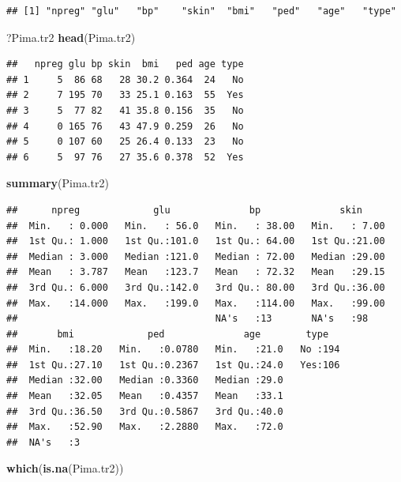 \documentclass[]{book}
\newenvironment{Shaded}{\begin{snugshade}}{\end{snugshade}}
\newcommand{\KeywordTok}[1]{\textcolor[rgb]{0.13,0.29,0.53}{\textbf{#1}}}
\newcommand{\NormalTok}[1]{#1}
\begin{document}
\begin{verbatim}
## [1] "npreg" "glu"   "bp"    "skin"  "bmi"   "ped"   "age"   "type"
\end{verbatim}

\begin{Shaded}
\begin{Highlighting}[]
\NormalTok{?Pima.tr2}
\KeywordTok{head}\NormalTok{(Pima.tr2)}
\end{Highlighting}
\end{Shaded}

\begin{verbatim}
##   npreg glu bp skin  bmi   ped age type
## 1     5  86 68   28 30.2 0.364  24   No
## 2     7 195 70   33 25.1 0.163  55  Yes
## 3     5  77 82   41 35.8 0.156  35   No
## 4     0 165 76   43 47.9 0.259  26   No
## 5     0 107 60   25 26.4 0.133  23   No
## 6     5  97 76   27 35.6 0.378  52  Yes
\end{verbatim}

\begin{Shaded}
\begin{Highlighting}[]
\KeywordTok{summary}\NormalTok{(Pima.tr2)}
\end{Highlighting}
\end{Shaded}

\begin{verbatim}
##      npreg             glu              bp              skin      
##  Min.   : 0.000   Min.   : 56.0   Min.   : 38.00   Min.   : 7.00  
##  1st Qu.: 1.000   1st Qu.:101.0   1st Qu.: 64.00   1st Qu.:21.00  
##  Median : 3.000   Median :121.0   Median : 72.00   Median :29.00  
##  Mean   : 3.787   Mean   :123.7   Mean   : 72.32   Mean   :29.15  
##  3rd Qu.: 6.000   3rd Qu.:142.0   3rd Qu.: 80.00   3rd Qu.:36.00  
##  Max.   :14.000   Max.   :199.0   Max.   :114.00   Max.   :99.00  
##                                   NA's   :13       NA's   :98     
##       bmi             ped              age        type    
##  Min.   :18.20   Min.   :0.0780   Min.   :21.0   No :194  
##  1st Qu.:27.10   1st Qu.:0.2367   1st Qu.:24.0   Yes:106  
##  Median :32.00   Median :0.3360   Median :29.0            
##  Mean   :32.05   Mean   :0.4357   Mean   :33.1            
##  3rd Qu.:36.50   3rd Qu.:0.5867   3rd Qu.:40.0            
##  Max.   :52.90   Max.   :2.2880   Max.   :72.0            
##  NA's   :3
\end{verbatim}

\begin{Shaded}
\begin{Highlighting}[]
\KeywordTok{which}\NormalTok{(}\KeywordTok{is.na}\NormalTok{(Pima.tr2))}
\end{Highlighting}
\end{Shaded}
\end{document}
